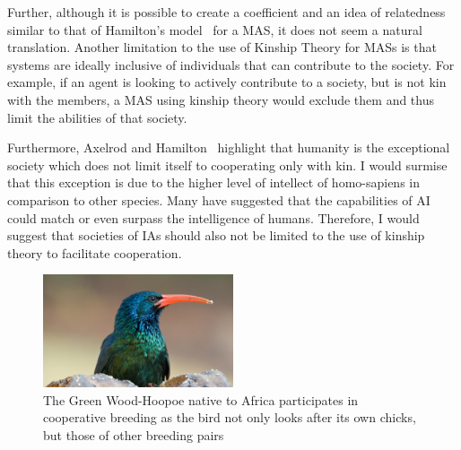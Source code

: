 \documentclass[]{final_report}
\begin{document}
Further, although it is possible to create a coefficient and an idea of relatedness similar to that of Hamilton's model~\cite{kinhamilton} for a MAS, it does not seem a natural translation. Another limitation to the use of Kinship Theory for MASs is that systems are ideally inclusive of individuals that can contribute to the society. For example, if an agent is looking to actively contribute to a society, but is not kin with the members, a MAS using kinship theory would exclude them and thus limit the abilities of that society.\par
Furthermore, Axelrod and Hamilton~\cite{evolution_of_cooperation} highlight that humanity is the exceptional society which does not limit itself to cooperating only with kin. I would surmise that this exception is due to the higher level of intellect of homo-sapiens in comparison to other species. Many have suggested that the capabilities of AI could match or even surpass the intelligence of humans. Therefore, I would suggest that societies of IAs should also not be limited to the use of kinship theory to facilitate cooperation.
\begin{figure}
	\center
	\includegraphics[width=0.5\textwidth]{green-wood-hoopoe.jpg}
	\caption{The Green Wood-Hoopoe native to Africa participates in cooperative breeding as the bird not only looks after its own chicks, but those of other breeding pairs~\cite{hoopoe}}
	\label{fig:hoopoe}
\end{figure}
\end{document}
